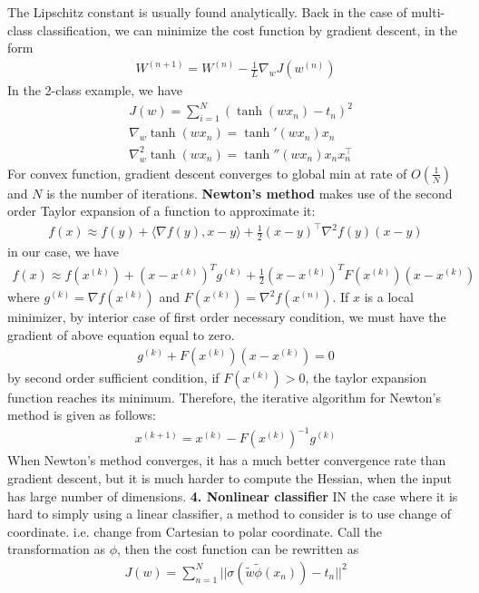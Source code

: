 \documentclass[11pt]{article}
\theoremstyle{plain}
\theoremstyle{definition}
\begin{document}
The Lipschitz constant is usually found analytically. 
Back in the case of multi-class classification, we can minimize the cost function by gradient descent, in the form \begin{align*}
W^{(n+1)} = W^{(n)} - \frac{1}{L} \nabla_w J(w^{(n)})
\end{align*}
In the 2-class example, we have 
\begin{align*}
&J(w) = \sum\limits_{i=1}^{N} (\tanh(wx_n)-t_n)^2 \\
&\nabla_w \tanh(wx_n) = \tanh'(wx_n) x_n \\
&\nabla^2_w \tanh(wx_n) = \tanh''(wx_n)x_n x_n^\top
\end{align*}
For convex function, gradient descent converges to global min at rate of $O(\frac{1}{N})$ and $N$ is the number of iterations.\newline 
\textbf{Newton's method} makes use of the second order Taylor expansion of a function to approximate it: \begin{align*}
f(x) \approx f(y) + \langle \nabla f(y), x-y \rangle + \frac{1}{2} (x-y)^\top \nabla^2 f(y) (x-y)
\end{align*}
in our case, we have 
\begin{align*}
f(x)\approx f(x^{(k)}) + (x-x^{(k)})^Tg^{(k)} + \frac{1}{2}(x-x^{(k)})^TF(x^{(k)})(x-x^{(k)})
\end{align*}
where $g^{(k)} = \nabla f(x^{(k)})$ and $F(x^{(k)}) = \nabla^2 f(x^{(n)})$. If $x$ is a local minimizer, by interior case of first order necessary condition, we must have the gradient of above equation equal to zero.
\begin{align*}
g^{(k)} + F(x^{(k)})(x-x^{(k)}) = 0
\end{align*}
by second order sufficient condition, if $F(x^{(k)}) > 0$, the taylor expansion function reaches its minimum. Therefore, the iterative algorithm for Newton's method is given as follows:
\begin{align*}
x^{(k+1)} = x^{(k)} - F(x^{(k)})^{-1}g^{(k)}
\end{align*}
When Newton's method converges, it has a much better convergence rate than gradient descent, but it is much harder to compute the Hessian, when the input has large number of dimensions. 
\vspace{10mm} \newline 
\textbf{4. Nonlinear classifier}\newline
\vspace{5mm} 
IN the case where it is hard to simply using a linear classifier, a method to consider is to use change of coordinate. i.e. change from Cartesian to polar coordinate. Call the transformation as $\phi$, then the cost function can be rewritten as \begin{align*}
J(w) = \sum\limits_{n=1}^N || \sigma(\tilde{w}\tilde{\phi}(x_n)) - t_n||^2
\end{align*}
\end{document}
